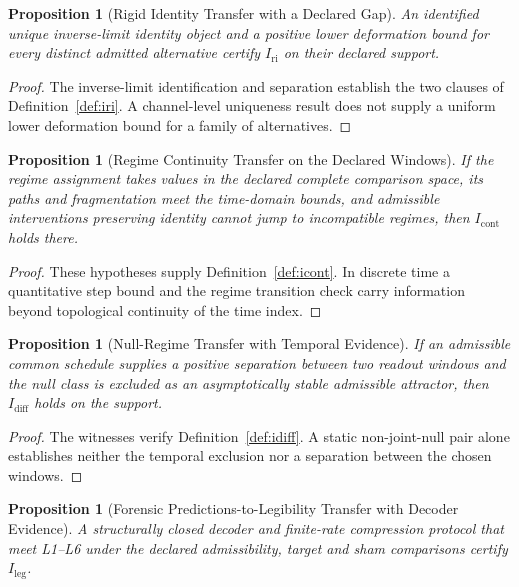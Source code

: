 \documentclass[11pt,a4paper]{article}
\newtheorem{proposition}[theorem]{Proposition}
\theoremstyle{definition}
\newcommand{\Iri}{I_{\mathrm{ri}}}
\newcommand{\Icont}{I_{\mathrm{cont}}}
\newcommand{\Idiff}{I_{\mathrm{diff}}}
\newcommand{\Ileg}{I_{\mathrm{leg}}}
\begin{document}
\begin{proposition}[Rigid Identity Transfer with a Declared Gap]\label{prop:p1-ri}
An identified unique inverse-limit identity object and a positive lower deformation bound for every distinct admitted alternative certify $\Iri$ on their declared support.
\end{proposition}

\begin{proof}
The inverse-limit identification and separation establish the two clauses of Definition~\ref{def:iri}. A channel-level uniqueness result does not supply a uniform lower deformation bound for a family of alternatives.
\end{proof}

\begin{proposition}[Regime Continuity Transfer on the Declared Windows]\label{prop:p2-cont}
If the regime assignment takes values in the declared complete comparison space, its paths and fragmentation meet the time-domain bounds, and admissible interventions preserving identity cannot jump to incompatible regimes, then $\Icont$ holds there.
\end{proposition}

\begin{proof}
These hypotheses supply Definition~\ref{def:icont}. In discrete time a quantitative step bound and the regime transition check carry information beyond topological continuity of the time index.
\end{proof}

\begin{proposition}[Null-Regime Transfer with Temporal Evidence]\label{prop:p3-diff}
If an admissible common schedule supplies a positive separation between two readout windows and the null class is excluded as an asymptotically stable admissible attractor, then $\Idiff$ holds on the support.
\end{proposition}

\begin{proof}
The witnesses verify Definition~\ref{def:idiff}. A static non-joint-null pair alone establishes neither the temporal exclusion nor a separation between the chosen windows.
\end{proof}

\begin{proposition}[Forensic Predictions-to-Legibility Transfer with Decoder Evidence]\label{prop:p4-leg}
A structurally closed decoder and finite-rate compression protocol that meet L1--L6 under the declared admissibility, target and sham comparisons certify $\Ileg$.
\end{proposition}
\end{document}
